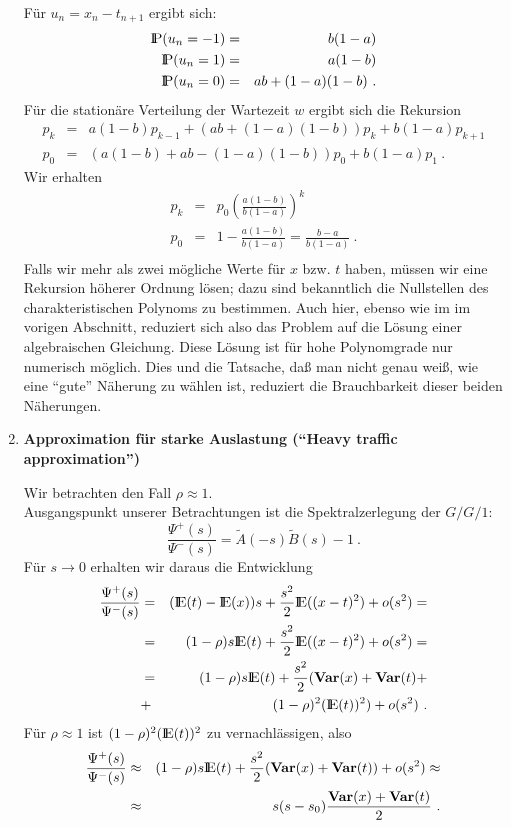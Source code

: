\begin{enumerate}
Für $u_{n}=x_{n}-t_{n+1}$ ergibt sich:
\begin{eqnarray*}
   {\rm I\kern-0.2em P}(u_{n}=-1)&=&b(1-a) \\
   {\rm I\kern-0.2em P}(u_{n}=1)&=&a(1-b) \\
   {\rm I\kern-0.2em P}(u_{n}=0)&=&ab+(1-a)(1-b) ~.
\end{eqnarray*}
Für die stationäre Verteilung der Wartezeit $w$ ergibt sich die Rekursion
\begin{eqnarray*}
  p_{k}&=&a(1-b)p_{k-1}+(ab+(1-a)(1-b))p_{k}+b(1-a)p_{k+1} \\
  p_{0}&=&(a(1-b)+ab-(1-a)(1-b))p_{0}+b(1-a)p_{1} ~.
\end{eqnarray*}
Wir erhalten
\begin{eqnarray*}
  p_{k}&=&p_{0}\left( \frac{a(1-b)}{b(1-a)}\right)^{k} \\
  p_{0}&=&1-\frac{a(1-b)}{b(1-a)}=\frac{b-a}{b(1-a)} ~.\\
\end{eqnarray*}
Falls wir mehr als zwei mögliche Werte für $x$ bzw. $t$ haben, müssen wir eine Rekursion höherer Ordnung lösen; dazu sind bekanntlich die Nullstellen des
charakteristischen Polynoms zu bestimmen. Auch hier, ebenso wie im im vorigen Abschnitt, reduziert sich also das Problem auf die Lösung einer algebraischen
Gleichung. Diese Lösung ist für hohe Polynomgrade nur numerisch möglich. Dies und die Tatsache, daß man nicht genau weiß, wie eine \enquote{gute} Näherung zu
wählen
ist, reduziert die Brauchbarkeit dieser beiden Näherungen.

\item {\bf Approximation für starke Auslastung (\enquote{Heavy traffic approximation})}

Wir betrachten den Fall $\rho \approx 1$. \\
Ausgangspunkt unserer Betrachtungen ist die Spektralzerlegung der $G/G/1$:
\[\frac{\Psi^{+}(s)}{\Psi^{-}(s)}=\tilde A (-s)\tilde B (s)-1 ~.\]
Für $s \rightarrow 0$ erhalten wir daraus die Entwicklung
\begin{eqnarray*}
  \frac{\Psi^{+}(s)}{\Psi^{-}(s)}&=&({\rm I\kern-0.2em E}(t)-{\rm I\kern-0.2em E}(x))s+\frac{s^{2}}{2}{\rm I\kern-0.2em E}((x-t)^{2})+o(s^{2})= \\
                                 &=&(1-\rho)s{\rm I\kern-0.2em E}(t)+\frac{s^{2}}{2}{\rm I\kern-0.2em E}((x-t)^{2})+o(s^{2})=  \\
                                 &=&(1-\rho)s{\rm I\kern-0.2em E}(t)+\frac{s^{2}}{2}({\bf Var}(x)+{\bf Var}(t)+ \\
                                 &+&(1-\rho)^{2}({\rm I\kern-0.2em E}(t))^{2}) + o(s^{2}) ~.
\end{eqnarray*}
Für $\rho \approx 1$ ist $(1-\rho)^{2}({\rm I\kern-0.2em E}(t))^{2}$ zu vernachlässigen, also
\begin{eqnarray*}
  \frac{\Psi^{+}(s)}{\Psi^{-}(s)}&\approx&(1-\rho)s{\rm I\kern-0.2em E}(t)+\frac{s^{2}}{2}({\bf Var}(x)+{\bf Var}(t))+o(s^{2}) \approx \\
  &\approx&s(s-s_{0}) \frac{{\bf Var}(x)+{\bf Var}(t)}{2} ~.
\end{eqnarray*}


\end{enumerate}
